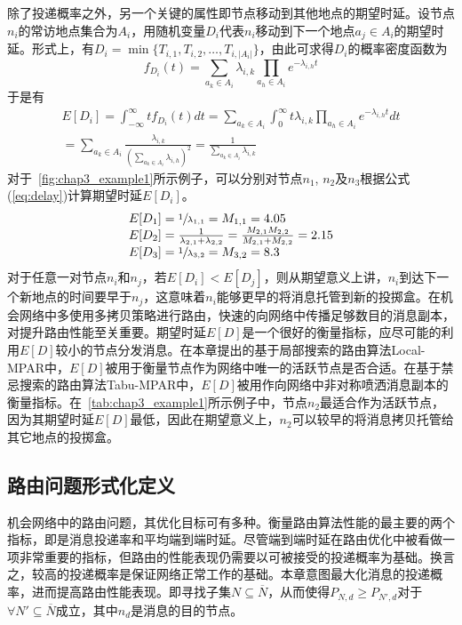 除了投递概率之外，另一个关键的属性即节点移动到其他地点的期望时延。设节点$n_i$的常访地点集合为$A_i$，用随机变量$D_i$代表$n_i$移动到下一个地点$a_j\in A_i$的期望时延。形式上，有$D_i=\min\{T_{i,1},T_{i,2},\ldots,T_{i,|A_i|}\}$，由此可求得$D_i$的概率密度函数为
\[f_{D_i}(t)=\sum_{a_k\in A_i}\lambda_{i,k}\prod_{a_h\in A_i}e^{-\lambda_{i,h}t}\]
于是有
\begin{multline}
E[D_i]=\int_{-\infty}^{\infty}tf_{D_i}(t)dt 
=\sum_{a_k\in A_i}\int_{0}^{\infty}t\lambda_{i,k}\prod_{a_h\in A_i}e^{-\lambda_{i,h}t}dt \\
=\sum_{a_k\in A_i}\frac{\lambda_{i,k}}{\left(\sum_{a_k\in A_i}\lambda_{i,h}\right)^2}
=\frac{1}{\sum_{a_k\in A_i}\lambda_{i,k}}
\label{eq:delay}
\end{multline}
对于\figurename~\ref{fig:chap3_example1}所示例子，可以分别对节点$n_1$, $n_2$及$n_3$根据公式(\ref{eq:delay})计算期望时延$E[D_i]$。
\[
\begin{array}{l}
E[D_1]=\sfrac{1}{\lambda_{1,1}}=M_{1,1}=4.05\\
E[D_2]=\frac{1}{\lambda_{2,1}+\lambda_{2,2}}=\frac{M_{2,1}M_{2,2}}{M_{2,1}+M_{2,2}}=2.15\\
E[D_3]=\sfrac{1}{\lambda_{3,2}}=M_{3,2}=8.3 
\end{array}
\]
对于任意一对节点$n_i$和$n_j$，若$E[D_i]<E[D_j]$，则从期望意义上讲，$n_i$到达下一个新地点的时间要早于$n_j$，这意味着$n_i$能够更早的将消息托管到新的投掷盒。在机会网络中多使用多拷贝策略进行路由，快速的向网络中传播足够数目的消息副本，对提升路由性能至关重要。期望时延$E[D]$是一个很好的衡量指标，应尽可能的利用$E[D]$较小的节点分发消息。在本章提出的基于局部搜索的路由算法Local-MPAR中，$E[D]$被用于衡量节点作为网络中唯一的活跃节点是否合适。在基于禁忌搜索的路由算法Tabu-MPAR中，$E[D]$被用作向网络中非对称喷洒消息副本的衡量指标。在\tablename~\ref{tab:chap3_example1}所示例子中，节点$n_2$最适合作为活跃节点，因为其期望时延$E[D]$最低，因此在期望意义上，$n_2$可以较早的将消息拷贝托管给其它地点的投掷盒。

\subsection{路由问题形式化定义}
\label{chap3:路由问题形式化定义}

机会网络中的路由问题，其优化目标可有多种。衡量路由算法性能的最主要的两个指标，即是消息投递率和平均端到端时延。尽管端到端时延在路由优化中被看做一项非常重要的指标，但路由的性能表现仍需要以可被接受的投递概率为基础。换言之，较高的投递概率是保证网络正常工作的基础。本章意图最大化消息的投递概率，进而提高路由性能表现。即寻找子集$N\subseteq\overline{N}$，从而使得$P_{N,d}\geq P_{N',d}$对于$\forall N'\subseteq\overline{N}$成立，其中$n_d$是消息的目的节点。

